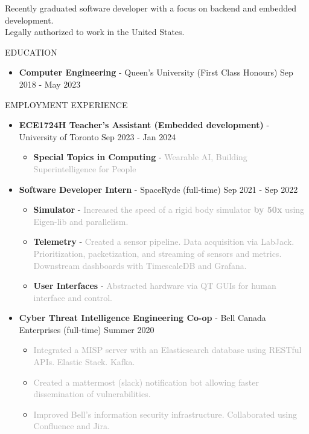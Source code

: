 \documentclass{resume} %
\begin{document}
Recently graduated software developer with a focus on backend and embedded development.\\
Legally authorized to work in the United States.

\begin{rSection}{EDUCATION}
    \begin{itemize}
        \item {\bf Computer Engineering} - Queen's University (First Class Honours) \hfill {Sep 2018 - May 2023}
    \end{itemize}
\end{rSection}

\begin{rSection}{EMPLOYMENT EXPERIENCE}
    \begin{itemize}
        \item {\bf ECE1724H Teacher's Assistant (Embedded development)} - University of Toronto \hfill {Sep 2023 - Jan 2024}
        \begin{itemize}[topsep=-10pt]
            \setlength\itemsep{-0.5em}
                \item[\textbullet] {\bf Special Topics in Computing} - \textcolor{darkgray}{Wearable AI, Building Superintelligence for People}
            \end{itemize}
        \item {\bf Software Developer Intern} - SpaceRyde (full-time) \hfill {Sep 2021 - Sep 2022}
        \begin{itemize}[topsep=-10pt]
            \setlength\itemsep{-0.5em}
            \item[\textbullet] {\bf Simulator} - \textcolor{darkgray}{Increased the speed of a rigid body simulator \textbf{by 50x} using Eigen-lib and parallelism.}
            \item[\textbullet] {\bf Telemetry} - \textcolor{darkgray}{Created a sensor pipeline. Data acquisition via LabJack. Prioritization, packetization, and streaming of sensors and metrics. Downstream dashboards with TimescaleDB and Grafana.}
            \item[\textbullet] {\bf User Interfaces} - \textcolor{darkgray}{Abstracted hardware via QT GUIs for human interface and control.}
        \end{itemize}
        \item {\bf Cyber Threat Intelligence Engineering Co-op} - Bell Canada Enterprises (full-time) \hfill {Summer 2020}
        \begin{itemize}[topsep=-10pt]
            \setlength\itemsep{-0.5em}
            \item[\textbullet] \textcolor{darkgray}{Integrated a MISP server with an Elasticsearch database using RESTful APIs. Elastic Stack. Kafka.}
            \item[\textbullet] \textcolor{darkgray}{Created a mattermost (slack) notification bot allowing faster dissemination of vulnerabilities.}
            \item[\textbullet] \textcolor{darkgray}{Improved Bell's information security infrastructure. Collaborated using Confluence and Jira.}
        \end{itemize}
    \end{itemize}
\end{rSection}
\end{document}
